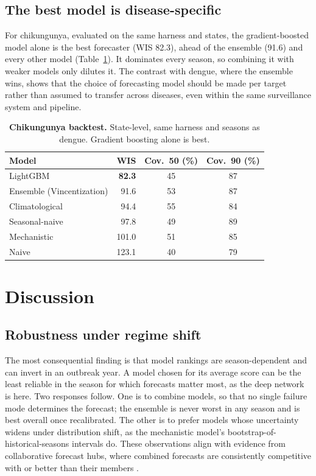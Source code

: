 \documentclass[11pt]{article}
\begin{document}
\subsection{The best model is disease-specific}\label{sec:chik}
For chikungunya, evaluated on the same harness and states, the gradient-boosted model alone is the
best forecaster (WIS 82.3), ahead of the ensemble (91.6) and every other model
(Table~\ref{tab:chik}). It dominates every season, so combining it with weaker models only dilutes
it. The contrast with dengue, where the ensemble wins, shows that the choice of forecasting model
should be made per target rather than assumed to transfer across diseases, even within the same
surveillance system and pipeline.

\begin{table}[t]
\centering\small
\caption{\textbf{Chikungunya backtest.} State-level, same harness and seasons as dengue. Gradient
boosting alone is best.}
\label{tab:chik}
\begin{tabular}{@{}lrcc@{}}
\toprule
\textbf{Model} & \textbf{WIS} & \textbf{Cov.\ 50 (\%)} & \textbf{Cov.\ 90 (\%)} \\
\midrule
LightGBM                  & \textbf{82.3} & 45 & 87 \\
Ensemble (Vincentization) & 91.6 & 53 & 87 \\
Climatological            & 94.4 & 55 & 84 \\
Seasonal-naive            & 97.8 & 49 & 89 \\
Mechanistic               & 101.0 & 51 & 85 \\
Naive                     & 123.1 & 40 & 79 \\
\bottomrule
\end{tabular}
\end{table}

\section{Discussion}

\subsection{Robustness under regime shift}
The most consequential finding is that model rankings are season-dependent and can invert in an
outbreak year. A model chosen for its average score can be the least reliable in the season for which
forecasts matter most, as the deep network is here. Two responses follow. One is to combine models,
so that no single failure mode determines the forecast; the ensemble is never worst in any season
and is best overall once recalibrated. The other is to prefer models whose uncertainty widens under
distribution shift, as the mechanistic model's bootstrap-of-historical-seasons intervals do. These
observations align with evidence from collaborative forecast hubs, where combined forecasts are
consistently competitive with or better than their members \citep{cramer2022,reich2019,sherratt2023}.
\end{document}
